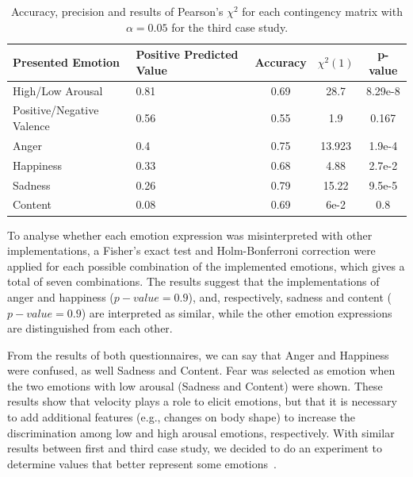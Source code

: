 \begin{table}[h]
	\begin{center}
\small
		\caption{Accuracy, precision and results of Pearson's $\chi^2$ for each contingency matrix with $\alpha = 0.05$ for the third case study.} 
\label{table:Precision}
		\begin{tabular}{|p{3 cm}|p{2 cm}|c|c|c|}
		\hline
		\textbf{Presented Emotion} & \textbf{Positive Predicted Value} & \textbf{Accuracy} & \textbf{$\chi^2(1)$} & \textbf{p-value}\\
		\hline		
		High/Low Arousal & 0.81 & 0.69 & 28.7 & 8.29e-8\\
		\hline
		Positive/Negative Valence & 0.56 & 0.55 & 1.9 & 0.167\\
		\hline
		\hline
		Anger & 0.4 & 0.75&13.923 & 1.9e-4\\
		\hline
		Happiness & 0.33 & 0.68&4.88&2.7e-2\\
		\hline
		Sadness & 0.26 & 0.79&15.22&9.5e-5\\
		\hline
		Content & 0.08 & 0.69&6e-2&0.8 \\		 
		\hline
		\end{tabular}
	\end{center}
\end{table}

To analyse whether each emotion expression was misinterpreted with other implementations, a Fisher's exact test and Holm-Bonferroni correction were applied for each possible combination of the implemented emotions, which gives a total of seven combinations.  
The results suggest that the implementations of anger and happiness ($p-value=0.9$), and, respectively, sadness and content ($p-value=0.9$) are interpreted as similar, while the other emotion expressions are distinguished from each other. %

From the results of both questionnaires, we can say that Anger and Happiness were confused, as well Sadness and Content. Fear was selected as emotion when the two emotions with low arousal (Sadness and Content) were shown. These results show that velocity plays a role to elicit emotions, but that it is necessary to add additional features (e.g., changes on body shape) to increase the discrimination among low and high arousal emotions, respectively. With similar results between first and third case study, we decided to do an experiment to determine values that better represent some emotions~\cite{Angel2017}.

